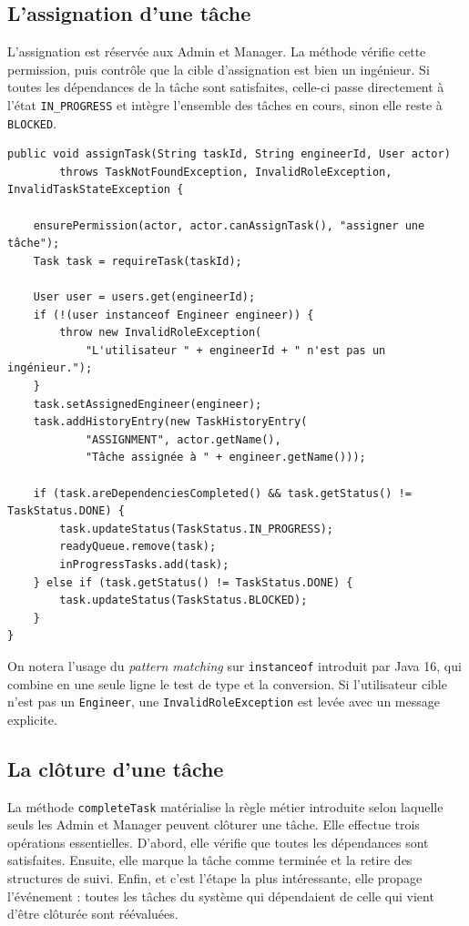 \documentclass[11pt]{article}
\begin{document}
\subsection{L'assignation d'une tâche}
L'assignation est réservée aux Admin et Manager. La méthode vérifie cette
permission, puis contrôle que la cible d'assignation est bien un
ingénieur. Si toutes les dépendances de la tâche sont satisfaites,
celle-ci passe directement à l'état \texttt{IN\_PROGRESS} et intègre
l'ensemble des tâches en cours, sinon elle reste à \texttt{BLOCKED}.

\begin{lstlisting}[caption={Assignation d'une tâche}]
public void assignTask(String taskId, String engineerId, User actor)
        throws TaskNotFoundException, InvalidRoleException, InvalidTaskStateException {

    ensurePermission(actor, actor.canAssignTask(), "assigner une tâche");
    Task task = requireTask(taskId);

    User user = users.get(engineerId);
    if (!(user instanceof Engineer engineer)) {
        throw new InvalidRoleException(
            "L'utilisateur " + engineerId + " n'est pas un ingénieur.");
    }
    task.setAssignedEngineer(engineer);
    task.addHistoryEntry(new TaskHistoryEntry(
            "ASSIGNMENT", actor.getName(),
            "Tâche assignée à " + engineer.getName()));

    if (task.areDependenciesCompleted() && task.getStatus() != TaskStatus.DONE) {
        task.updateStatus(TaskStatus.IN_PROGRESS);
        readyQueue.remove(task);
        inProgressTasks.add(task);
    } else if (task.getStatus() != TaskStatus.DONE) {
        task.updateStatus(TaskStatus.BLOCKED);
    }
}
\end{lstlisting}

On notera l'usage du \textit{pattern matching} sur \texttt{instanceof}
introduit par Java 16, qui combine en une seule ligne le test de type et
la conversion. Si l'utilisateur cible n'est pas un \texttt{Engineer}, une
\texttt{InvalidRoleException} est levée avec un message explicite.

\subsection{La clôture d'une tâche}
La méthode \texttt{completeTask} matérialise la règle métier introduite
selon laquelle seuls les Admin et Manager peuvent clôturer une tâche.
Elle effectue trois opérations essentielles. D'abord, elle vérifie que
toutes les dépendances sont satisfaites. Ensuite, elle marque la tâche
comme terminée et la retire des structures de suivi. Enfin, et c'est
l'étape la plus intéressante, elle propage l'événement : toutes les
tâches du système qui dépendaient de celle qui vient d'être clôturée
sont réévaluées.
\end{document}
